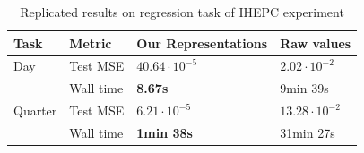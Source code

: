 



\begin{table}[h!]
\caption{Replicated results on regression task of IHEPC experiment}
\label{tab:ihepc}
\centering
\begin{tabular}{llll}
\hline
Task    & Metric    & Our Representations       & Raw values \\ \hline
Day     & Test MSE  &     $40.64 \cdot 10 ^{-5}$ & $2.02 \cdot 10^{-2}$ \\ 
        & Wall time &        \textbf{8.67s}            &  9min 39s  \\ \hline
Quarter & Test MSE  &   $6.21 \cdot 10^{-5}$ & $13.28 \cdot 10^{-2}$ \\ 
        & Wall time &       \textbf{1min 38s}      & 31min 27s      \\ \hline
\end{tabular}
\end{table}

